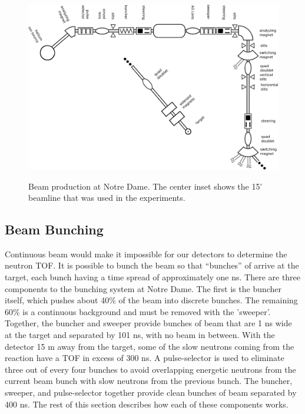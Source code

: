 \begin{figure}[htp]
\centering
\includegraphics[width=1.0\textwidth]{figures/NSL_beamline.eps}
\label{fig:beamline}
\caption{Beam production at Notre Dame.  The center inset shows the 15$^{\circ}$ beamline that was used in the \reaction experiments.}
\end{figure}

\subsection{Beam Bunching}

Continuous beam would make it impossible for our detectors to determine the neutron TOF.  It is possible to bunch the beam so that ``bunches'' of  arrive at the target, each bunch having a time spread of approximately one ns. There are three components to the bunching system at Notre Dame.  The first is the buncher itself, which pushes about 40\% of the beam into discrete bunches.  The remaining 60\% is a continuous background and must be removed with the 'sweeper'.  Together, the buncher and sweeper provide bunches of beam that are 1 ns wide at the target and separated by 101 ns, with no beam in between.  With the detector 15 m away from the target, some of the slow neutrons coming from the reaction have a TOF in excess of 300 ns.  A pulse-selector is used to eliminate three out of every four bunches to avoid overlapping energetic neutrons from the current beam bunch with slow neutrons from the previous bunch.  The buncher, sweeper, and pulse-selector together provide clean bunches of beam separated by 400 ns.  The rest of this section describes how each of these components works.

